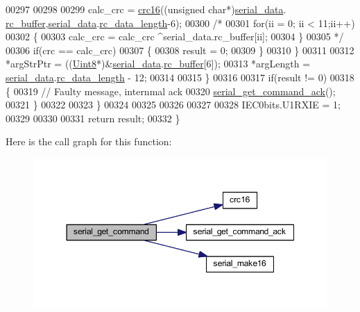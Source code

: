 \begin{DoxyCode}
00297                 
00298            
00299                 calc\_crc = \hyperlink{a00021_a6553827687db2137ee550ad6e1d2f316}{crc16}((\textcolor{keywordtype}{unsigned} \textcolor{keywordtype}{char}*)\hyperlink{a00030_a77d3b77ccd59a0065642bf1ac7887b9d}{serial\_data}.
      \hyperlink{a00030_ac734cb8be27f86bd99edc539434883a4}{rc\_buffer},\hyperlink{a00030_a77d3b77ccd59a0065642bf1ac7887b9d}{serial\_data}.\hyperlink{a00030_ab136d4fef2c523afd55b6ca74c46d7cc}{rc\_data\_length}-6);
00300               \textcolor{comment}{/*}
00301 \textcolor{comment}{                for(ii = 0; ii < 11;ii++)}
00302 \textcolor{comment}{                \{}
00303 \textcolor{comment}{                    calc\_crc = calc\_crc ^serial\_data.rc\_buffer[ii];}
00304 \textcolor{comment}{                \}}
00305 \textcolor{comment}{              */}
00306                 \textcolor{keywordflow}{if}(crc == calc\_crc)
00307                 \{
00308                     result = 0;
00309                 \}
00310             \}
00311 
00312             *argStrPtr =  ((\hyperlink{a00072_af84840501dec18061d18a68c162a8fa2}{Uint8}*)&\hyperlink{a00030_a77d3b77ccd59a0065642bf1ac7887b9d}{serial\_data}.\hyperlink{a00030_ac734cb8be27f86bd99edc539434883a4}{rc\_buffer}[6]);
00313             *argLength = \hyperlink{a00030_a77d3b77ccd59a0065642bf1ac7887b9d}{serial\_data}.\hyperlink{a00030_ab136d4fef2c523afd55b6ca74c46d7cc}{rc\_data\_length} - 12;
00314 
00315        \}
00316 
00317        \textcolor{keywordflow}{if}(result != 0)
00318        \{
00319             \textcolor{comment}{// Faulty message, internmal ack}
00320             \hyperlink{a00030_a7fc7421ed15d6e4516e9878e7455d715}{serial\_get\_command\_ack}();
00321        \}
00322 
00323     \}
00324 
00325 
00326 
00327 
00328     IEC0bits.U1RXIE = 1;
00329 
00330 
00331     \textcolor{keywordflow}{return} result;
00332 \}
\end{DoxyCode}


Here is the call graph for this function\+:
\nopagebreak
\begin{figure}[H]
\begin{center}
\leavevmode
\includegraphics[width=350pt]{d5/d79/a00030_a366b2707f4c7d76f0efc1b5cdde8e37e_cgraph}
\end{center}
\end{figure}



